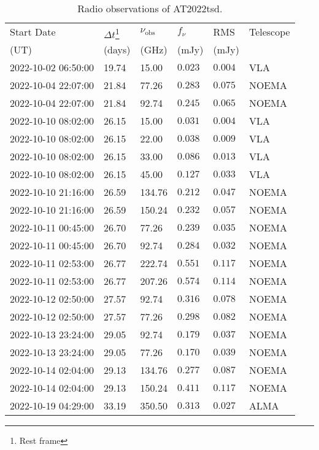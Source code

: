\documentclass{nature_plusfigure}
\begin{document}
\begin{supplement}
\begin{center} 
\begin{longtable}{llllll} 
\caption{Radio observations of AT2022tsd.} 
\label{tab:radio-observations}\\ 
\hline\hline
Start Date & $\Delta t$\footnote{Rest frame} & $\nu_\mathrm{obs}$ & $f_\nu$ & RMS & Telescope\\ 
(UT) & (days) & (GHz) & (mJy) & (mJy) & \\ 
\hline
2022-10-02 06:50:00 & 19.74 & 15.00 & $0.023$ & $0.004$ & VLA \\ 
2022-10-04 22:07:00 & 21.84 & 77.26 & $0.283$ & $0.075$ & NOEMA \\ 
2022-10-04 22:07:00 & 21.84 & 92.74 & $0.245$ & $0.065$ & NOEMA \\ 
2022-10-10 08:02:00 & 26.15 & 15.00 & $0.031$ & $0.004$ & VLA \\ 
2022-10-10 08:02:00 & 26.15 & 22.00 & $0.038$ & $0.009$ & VLA \\ 
2022-10-10 08:02:00 & 26.15 & 33.00 & $0.086$ & $0.013$ & VLA \\ 
2022-10-10 08:02:00 & 26.15 & 45.00 & $0.127$ & $0.033$ & VLA \\ 
2022-10-10 21:16:00 & 26.59 & 134.76 & $0.212$ & $0.047$ & NOEMA \\ 
2022-10-10 21:16:00 & 26.59 & 150.24 & $0.232$ & $0.057$ & NOEMA \\ 
2022-10-11 00:45:00 & 26.70 & 77.26 & $0.239$ & $0.035$ & NOEMA \\ 
2022-10-11 00:45:00 & 26.70 & 92.74 & $0.284$ & $0.032$ & NOEMA \\ 
2022-10-11 02:53:00 & 26.77 & 222.74 & $0.551$ & $0.117$ & NOEMA \\ 
2022-10-11 02:53:00 & 26.77 & 207.26 & $0.574$ & $0.114$ & NOEMA \\ 
2022-10-12 02:50:00 & 27.57 & 92.74 & $0.316$ & $0.078$ & NOEMA \\ 
2022-10-12 02:50:00 & 27.57 & 77.26 & $0.298$ & $0.082$ & NOEMA \\ 
2022-10-13 23:24:00 & 29.05 & 92.74 & $0.179$ & $0.037$ & NOEMA \\ 
2022-10-13 23:24:00 & 29.05 & 77.26 & $0.170$ & $0.039$ & NOEMA \\ 
2022-10-14 02:04:00 & 29.13 & 134.76 & $0.277$ & $0.087$ & NOEMA \\ 
2022-10-14 02:04:00 & 29.13 & 150.24 & $0.411$ & $0.117$ & NOEMA \\ 
2022-10-19 04:29:00 & 33.19 & 350.50 & $0.313$ & $0.027$ & ALMA \\ 

\end{longtable}
\end{center}
\end{supplement}
\end{document}
